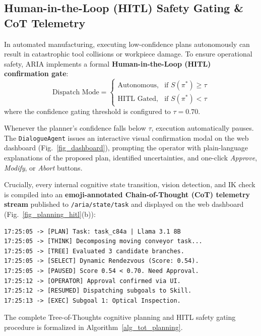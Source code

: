 \documentclass[journal]{IEEEtran}
\begin{document}
\subsection{Human-in-the-Loop (HITL) Safety Gating \& CoT Telemetry}
In automated manufacturing, executing low-confidence plans autonomously can result in catastrophic tool collisions or workpiece damage. To ensure operational safety, ARIA implements a formal \textbf{Human-in-the-Loop (HITL) confirmation gate}:
\begin{equation}
\text{Dispatch Mode} = \begin{cases}
\text{Autonomous}, & \text{if } S(\pi^*) \ge \tau \\
\text{HITL Gated}, & \text{if } S(\pi^*) < \tau
\end{cases}
\end{equation}
where the confidence gating threshold is configured to $\tau = 0.70$.

Whenever the planner's confidence falls below $\tau$, execution automatically pauses. The \texttt{DialogueAgent} issues an interactive visual confirmation modal on the web dashboard (Fig.~\ref{fig_dashboard}), prompting the operator with plain-language explanations of the proposed plan, identified uncertainties, and one-click \textit{Approve}, \textit{Modify}, or \textit{Abort} buttons.

Crucially, every internal cognitive state transition, vision detection, and IK check is compiled into an \textbf{emoji-annotated Chain-of-Thought (CoT) telemetry stream} published to \texttt{/aria/state/task} and displayed on the web dashboard (Fig.~\ref{fig_planning_hitl}(b)):
{\scriptsize
\begin{verbatim}
17:25:05 -> [PLAN] Task: task_c84a | Llama 3.1 8B
17:25:05 -> [THINK] Decomposing moving conveyor task...
17:25:05 -> [TREE] Evaluated 3 candidate branches.
17:25:05 -> [SELECT] Dynamic Rendezvous (Score: 0.54).
17:25:05 -> [PAUSED] Score 0.54 < 0.70. Need Approval.
17:25:12 -> [OPERATOR] Approval confirmed via UI.
17:25:12 -> [RESUMED] Dispatching subgoals to Skill.
17:25:13 -> [EXEC] Subgoal 1: Optical Inspection.
\end{verbatim}
}

The complete Tree-of-Thoughts cognitive planning and HITL safety gating procedure is formalized in Algorithm~\ref{alg_tot_planning}.
\end{document}
